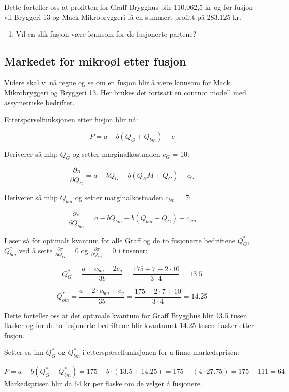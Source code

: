 \documentclass[
  12pt,
  a4paper,
  DIV=11,
  numbers=noendperiod]{scrartcl}
\providecommand{\tightlist}{%
  \setlength{\itemsep}{0pt}\setlength{\parskip}{0pt}}\usepackage{longtable,booktabs,array}
\begin{document}
Dette forteller oss at profitten for Graff Brygghus blir 110.062,5 kr og
før fusjon vil Bryggeri 13 og Mack Mikrobryggeri få en summert profitt
på 283.125 kr.

\clearpage

\begin{enumerate}
\def\labelenumi{\alph{enumi})}
\tightlist
\item
  Vil en slik fusjon være lønnsom for de fusjonerte partene?
\end{enumerate}

\subsection{Markedet for mikroøl etter
fusjon}\label{markedet-for-mikrouxf8l-etter-fusjon}

Videre skal vi nå regne og se om en fusjon blir å være lønnsom for Mack
Mikrobryggeri og Bryggeri 13. Her brukes det fortsatt en cournot modell
med assymetriske bedrifter.

Etterspørselfunksjonen etter fusjon blir nå:

\[P = a - b(Q_G+Q_{bm})-c \tag{29}\]

Deriverer så mhp \(Q_{G}\) og setter marginalkostnaden \(c_{G}\) = 10:

\[\frac{\partial \pi}{\partial Q_G} = a - b Q_G - b(Q_BM+Q_G) -c_G \tag{30}\]

Deriverer så mhp \(Q_{bm}\) og setter marginalkostnaden \(c_{bm}\) = 7:

\[\frac{\partial \pi}{\partial Q_{bm}} = a - bQ_{bm} - b(Q_{bm}+Q_G) -c_{bm} \tag{31}\]

Løser så for optimalt kvantum for alle Graff og de to fusjonerte
bedriftene \(Q_G^*\), \(Q_{bm}^*\) ved å sette
\(\frac{\partial \pi}{\partial Q_G} = 0\) og
\(\frac{\partial \pi}{\partial Q_{bm}} = 0\) i tusener:

\[Q_G^* = \frac{a + c_{bm} -2 c_g }{3b} = \frac{175 + 7 -2 \cdot 10}{3 \cdot4} = 13.5 \tag{32}\]

\[Q_{bm}^* = \frac{a -2 \cdot c_{bm}+c_g }{3b} = \frac{175 -2 \cdot 7 + 10}{3 \cdot4} = 14.25 \tag{33}\]

Dette forteller oss at det optimale kvantum for Graff Brygghus blir 13.5
tusen flasker og for de to fusjonerte bedriftene blir kvantumet 14.25
tusen flasker etter fusjon.

Setter så inn \(Q_G^*\) og \(Q_{bm}^*\) i etterspørselfunksjonen for å
finne markedsprisen:

\[P = a - b(Q_G^*+Q_{bm}^*) = 175 - b \cdot (13.5 + 14.25) = 175 - (4 \cdot 27.75)  = 175 - 111 = 64 \tag{34}\]
Markedsprisen blir da 64 kr per flaske om de velger å fusjonere.
\end{document}

